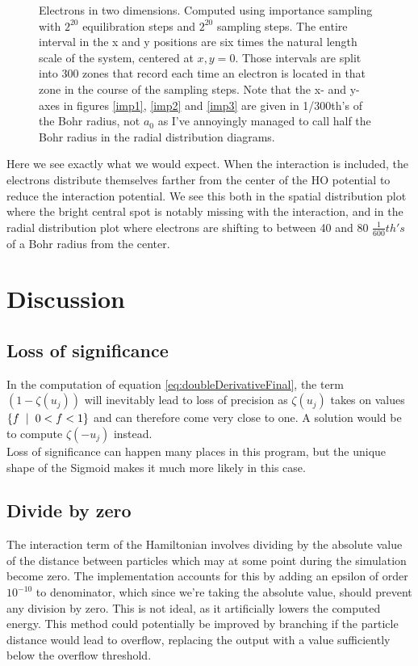 \documentclass[11pt,a4paper,titlepage]{article}
\begin{document}
\begin{figure}[H]
\begin{subfigure}[b]{.5\textwidth}
\label{imp4}
\end{subfigure}
\caption[Spatial distribution of electrons]{Electrons in two dimensions. Computed using importance sampling with $2^{20}$ equilibration steps and $2^{20}$ sampling steps. The entire interval in the x and y positions are six times the natural length scale of the system, centered at $x,y =0$. Those intervals are split into 300 zones that record each time an electron is located in that zone in the course of the sampling steps. Note that the x- and y- axes in figures \ref{imp1}, \ref{imp2} and \ref{imp3} are given in 1/300th's of the Bohr radius, not $a_0$ as I've annoyingly managed to call half the Bohr radius in the radial distribution diagrams.}
\label{fig:IMportance_pos_sampling}
\end{figure}
Here we see exactly what we would expect. When the interaction is included, the electrons distribute themselves farther from the center of the HO potential to reduce the interaction potential. We see this both in the spatial distribution plot where the bright central spot is notably missing with the interaction, and in the radial distribution plot where electrons are shifting to between 40 and 80 $\frac{1}{600}th's$ of a Bohr radius from the center.

 
\section{Discussion}
\subsection{Loss of significance}
In the computation of equation \eqref{eq:doubleDerivativeFinal}, the term $(1-\zeta(u_j))$ will inevitably lead to loss of precision as $\zeta(u_j)$ takes on values $\{f \hspace{2mm}|\hspace{2mm} 0<f<1 \}$ and can therefore come very close to one. A solution would be to compute $\zeta(-u_j)$ instead.\\Loss of significance can happen many places in this program, but the unique shape of the Sigmoid makes it much more likely in this case.
\subsection{Divide by zero}
The interaction term of the Hamiltonian involves dividing by the absolute value of the distance between particles which may at some point during the simulation become zero. The implementation accounts for this by adding an epsilon of order $10^{-10}$ to denominator, which since we're taking the absolute value, should prevent any division by zero. This is not ideal, as it artificially lowers the computed energy. This method could potentially be improved by branching if the particle distance would lead to overflow, replacing the output with a value sufficiently below the overflow threshold.
\end{document}
